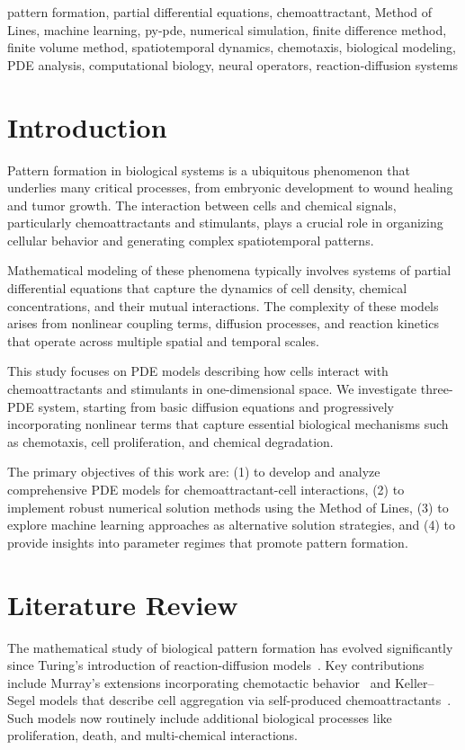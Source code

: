 \documentclass[conference]{IEEEtran}
\begin{document}
\begin{IEEEkeywords}
pattern formation, partial differential equations, chemoattractant, Method of Lines, machine learning, py-pde, numerical simulation, finite difference method, finite volume method, spatiotemporal dynamics, chemotaxis, biological modeling, PDE analysis, computational biology, neural operators, reaction-diffusion systems
\end{IEEEkeywords}

\section{Introduction}
Pattern formation in biological systems is a ubiquitous phenomenon that underlies many critical processes, from embryonic development to wound healing and tumor growth. The interaction between cells and chemical signals, particularly chemoattractants and stimulants, plays a crucial role in organizing cellular behavior and generating complex spatiotemporal patterns.

Mathematical modeling of these phenomena typically involves systems of partial differential equations that capture the dynamics of cell density, chemical concentrations, and their mutual interactions. The complexity of these models arises from nonlinear coupling terms, diffusion processes, and reaction kinetics that operate across multiple spatial and temporal scales.

This study focuses on PDE models describing how cells interact with chemoattractants and stimulants in one-dimensional space. We investigate three-PDE system, starting from basic diffusion equations and progressively incorporating nonlinear terms that capture essential biological mechanisms such as chemotaxis, cell proliferation, and chemical degradation.

The primary objectives of this work are: (1) to develop and analyze comprehensive PDE models for chemoattractant-cell interactions, (2) to implement robust numerical solution methods using the Method of Lines, (3) to explore machine learning approaches as alternative solution strategies, and (4) to provide insights into parameter regimes that promote pattern formation.

\section{Literature Review}

The mathematical study of biological pattern formation has evolved significantly since Turing’s introduction of reaction-diffusion models~\cite{turing1952morphogenesis}. Key contributions include Murray’s extensions incorporating chemotactic behavior~\cite{murray2003mathematical} and Keller–Segel models that describe cell aggregation via self-produced chemoattractants~\cite{keller1970instability}. Such models now routinely include additional biological processes like proliferation, death, and multi-chemical interactions.
\end{document}

